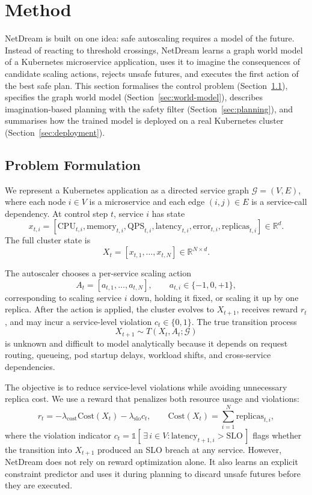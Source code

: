 \section{Method}
\label{sec:method}

NetDream is built on one idea: safe autoscaling requires a model of the
future. Instead of reacting to threshold crossings, NetDream learns a
graph world model of a Kubernetes microservice application, uses it to
imagine the consequences of candidate scaling actions, rejects unsafe
futures, and executes the first action of the best safe plan. This
section formalises the control problem
(Section~\ref{sec:formulation}), specifies the graph world model
(Section~\ref{sec:world-model}), describes imagination-based planning
with the safety filter (Section~\ref{sec:planning}), and summarises how
the trained model is deployed on a real Kubernetes cluster
(Section~\ref{sec:deployment}).

\subsection{Problem Formulation}
\label{sec:formulation}

We represent a Kubernetes application as a directed service graph
$\mathcal{G}=(V,E)$, where each node $i\in V$ is a microservice and each
edge $(i,j)\in E$ is a service-call dependency. At control step $t$,
service $i$ has state
\[
x_{t,i} =
[\mathrm{CPU}_{t,i}, \mathrm{memory}_{t,i}, \mathrm{QPS}_{t,i},
\mathrm{latency}_{t,i}, \mathrm{error}_{t,i}, \mathrm{replicas}_{t,i}]
\in \mathbb{R}^{d}.
\]
The full cluster state is
\[
X_t = [x_{t,1},\ldots,x_{t,N}] \in \mathbb{R}^{N\times d}.
\]

The autoscaler chooses a per-service scaling action
\[
A_t=[a_{t,1},\ldots,a_{t,N}], \qquad a_{t,i}\in\{-1,0,+1\},
\]
corresponding to scaling service $i$ down, holding it fixed, or scaling
it up by one replica. After the action is applied, the cluster evolves
to $X_{t+1}$, receives reward $r_t$, and may incur a service-level
violation $c_t\in\{0,1\}$. The true transition process
\[
X_{t+1}\sim T(X_t,A_t;\mathcal{G})
\]
is unknown and difficult to model analytically because it depends on
request routing, queueing, pod startup delays, workload shifts, and
cross-service dependencies.

The objective is to reduce service-level violations while avoiding
unnecessary replica cost. We use a reward that penalizes both resource
usage and violations:
\[
r_t =
-\lambda_{\mathrm{cost}}\mathrm{Cost}(X_t)
-\lambda_{\mathrm{slo}}c_t,
\qquad
\mathrm{Cost}(X_t)
=
\sum_{i=1}^{N}\mathrm{replicas}_{t,i},
\]
where the violation indicator $c_t = \mathds{1}[\,\exists\,i\in V :
\mathrm{latency}_{t+1,i}>\mathrm{SLO}\,]$ flags whether the transition
into $X_{t+1}$ produced an SLO breach at any service.
However, NetDream does not rely on reward optimization alone. It also
learns an explicit constraint predictor and uses it during planning to
discard unsafe futures before they are executed.

